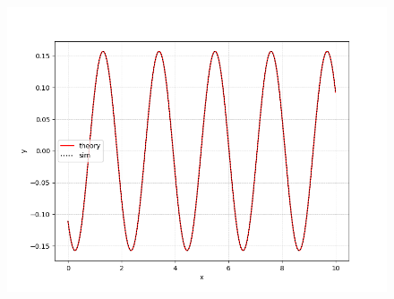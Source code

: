 \documentclass[journal,12pt,onecolumn]{IEEEtran}
\theoremstyle{remark}
\begin{document}
\begin{figure}[h]
    \centering
    \includegraphics[width=\columnwidth]{figs/fig.png}
 \end{figure}
\end{document}
